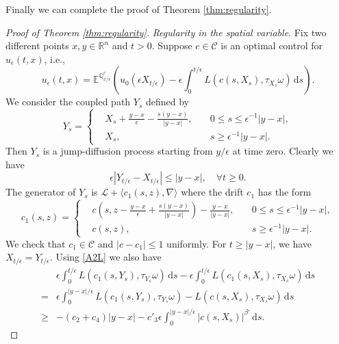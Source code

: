 \documentclass[11pt,reqno]{amsart}
\theoremstyle{definition}
\theoremstyle{remark}
\numberwithin{equation}{section}
\newcommand{\eps}{\epsilon}
\newcommand{\R}{{\mathbb{R}}}
\begin{document}
Finally we can complete the proof of Theorem \ref{thm:regularity}.
\begin{proof}[Proof of Theorem \ref{thm:regularity}] \emph{Regularity in the spatial variable}. Fix two different points $x,y\in \R^n$ and $t>0$. Suppose $c \in \mathscr{C}$ is an optimal control for $u_\eps(t,x)$, i.e.,
\begin{equation*}
u_\eps(t,x) = \mathbb{E}^{\mathbb{Q}^{c}_{x/\eps}} \left( u_0(\eps X_{t/\eps}) - \eps \int_0^{t/\eps} L(c(s,X_s),\tau_{X_s}\omega)\,\mathrm{d}s\right).
\end{equation*}
We consider the coupled path $Y_s$ defined by
\begin{equation*}
Y_s = \left\{
\begin{aligned}
&X_s + \frac{y-x}{\eps} - \frac{s(y-x)}{|y-x|}, \quad &0\le s\le \eps^{-1}|y-x|,\\
&X_s, \quad &s\ge \eps^{-1}|y-x|.
\end{aligned}
\right.
\end{equation*}
Then $Y_s$ is a jump-diffusion process starting from $y/\eps$ at time zero. Clearly we have
\begin{equation}
\label{eq:XYcouple-1}
\eps |Y_{t/\eps} - X_{t/\eps}| \le |y-x|, \quad \forall t\ge 0.
\end{equation}
The generator of $Y_s$ is $\mathscr{L} + \langle c_1(s,z),\nabla\rangle$ where the drift $c_1$ has the form
\begin{equation*}
c_1(s,z) = \left\{
\begin{aligned}
&c\left(s,z - \frac{y-x}{\eps} + \frac{s(y-x)}{|y-x|}\right) - \frac{y-x}{|y-x|}, \quad &0\le s\le \eps^{-1}|y-x|,\\
&c(s,z), \quad &s\ge \eps^{-1}|y-x|.
\end{aligned}
\right.
\end{equation*}
We check that $c_1\in \mathscr{C}$ and $|c-c_1|\le 1$ uniformly. For $t\ge |y-x|$, we have $X_{t/\eps} = Y_{t/\eps}$. Using \eqref{A2L} we also have
\begin{equation*}
\begin{aligned}
&\eps\int_0^{t/\eps} L(c_1(s,Y_s),\tau_{Y_s}\omega)\,\mathrm{d}s - \eps\int_0^{t/\eps} L(c_1(s,X_s),\tau_{X_s}\omega) \,\mathrm{d}s \\
= &\eps\int_0^{|y-x|/\eps} L(c_1(s,Y_s),\tau_{Y_s}\omega)-  L(c(s,X_s),\tau_{X_s}\omega)\,\mathrm{d}s\\
\ge & -(c_2+c_4)|y-x| - c'_3 \eps \int_0^{|y-x|/\eps} |c(s,X_s)|^{\beta'}\,\mathrm{d}s.
\end{aligned}

\end{equation*}
\end{proof}
\end{document}
